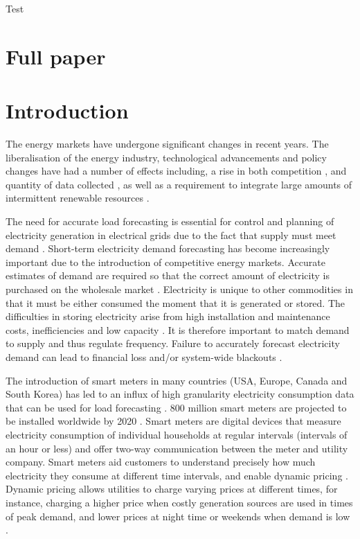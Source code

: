 Test












\section{Full paper}

\section{Introduction}

The energy markets have undergone significant changes in recent years. The liberalisation of the energy industry, technological advancements and policy changes have had a number of effects \cite{Viegas2016} including, a rise in both competition \cite{sioshansi_2009}, and quantity of data collected \cite{Clastres2011}, as well as a requirement to integrate large amounts of intermittent renewable resources \cite{Haben2013a,Kamgarpour2013,Curves2014}.

The need for accurate load forecasting is essential for control and planning of electricity generation in electrical grids due to the fact that supply must meet demand \cite{Lu1993}. Short-term electricity demand forecasting has become increasingly important due to the introduction of competitive energy markets. Accurate estimates of demand are required so that the correct amount of electricity is purchased on the wholesale market \cite{Dillon1991}. Electricity is unique to other commodities in that it must be either consumed the moment that it is generated or stored. The difficulties in storing electricity arise from high installation and maintenance costs, inefficiencies and low capacity \cite{Poonpun2008}. It is therefore important to match demand to supply and thus regulate frequency. Failure to accurately forecast electricity demand can lead to financial loss and/or system-wide blackouts \cite{Hines2008}.

The introduction of smart meters in many countries (USA, Europe, Canada and South Korea) has led to an influx of high granularity electricity consumption data that can be used for load forecasting \cite{Depuru2011a}. 800 million smart meters are projected to be installed worldwide by 2020 \cite{Telefonica2014}. Smart meters are digital devices that measure electricity consumption of individual households at regular intervals (intervals of an hour or less) and offer two-way communication between the meter and utility company. Smart meters aid customers to understand precisely how much electricity they consume at different time intervals, and enable dynamic pricing \cite{Abreu2012a}. Dynamic pricing allows utilities to charge varying prices at different times, for instance, charging a higher price when costly generation sources are used in times of peak demand, and lower prices at night time or weekends when demand is low \cite{Liu2016,Ito2013}. 

